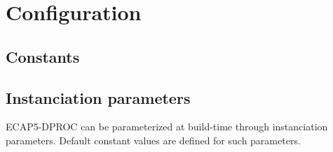 \section{Configuration}

\subsection{Constants}



\subsection{Instanciation parameters}

\begin{content}
ECAP5-DPROC can be parameterized at build-time through instanciation parameters. Default constant values are defined for such parameters.
\end{content}



\newpage

